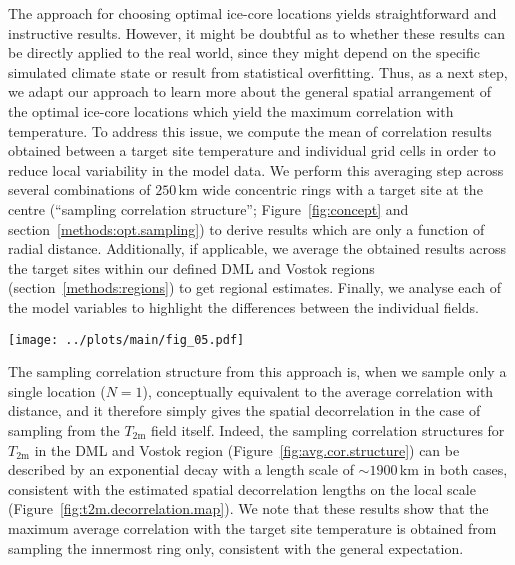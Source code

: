 \documentclass[draft]{agujournal2019}
\begin{document}
The approach for choosing optimal ice-core locations yields straightforward and
instructive results. However, it might be doubtful as to whether these results
can be directly applied to the real world, since they might depend on the
specific simulated climate state or result from statistical overfitting. Thus,
as a next step, we adapt our approach to learn more about the general spatial
arrangement of the optimal ice-core locations which yield the maximum
correlation with temperature. To address this issue, we compute the mean of
correlation results obtained between a target site temperature and individual
grid cells in order to reduce local variability in the model data. We perform
this averaging step across several combinations of $250$\,km wide concentric
rings with a target site at the centre (``sampling correlation structure'';
Figure~\ref{fig:concept} and section~\ref{methods:opt.sampling}) to derive
results which are only a function of radial distance. Additionally, if
applicable, we average the obtained results across the target sites within our
defined DML and Vostok regions (section~\ref{methods:regions}) to get regional
estimates. Finally, we analyse each of the model variables to highlight the
differences between the individual fields.

\begin{figure*}[t]%
\centering
\texttt{[image: ../plots/main/fig\_05.pdf]}
\caption{%
  Sampling correlation structures with temperature for the DML and Vostok
  regions in the case of sampling single locations. Shown is the average
  correlation as a function of distance between the interannual near-surface
  temperature ($T_{2\mathrm{m}}$) at a target site and the spatial fields of
  $T_{2\mathrm{m}}$ (black), oxygen isotope composition
  ($\delta^{18}\mathrm{O}$, green) and precipitation-weighted oxygen isotope
  composition ($\delta^{18}\mathrm{O}^{\mathrm{(pw)}}$, blue). Averaging was
  performed in two steps: first, correlations were averaged across grid cells
  falling within $250$\,km wide consecutive rings around a given target site,
  and secondly, the results were averaged across all respective target sites in
  the DML (\textbf{a}) and Vostok (\textbf{b}) region (see Methods). The black
  dashed lines indicate an exponential fit to the $T_{2\mathrm{m}}$ data.}
\label{fig:avg.cor.structure}%
\end{figure*}%

The sampling correlation structure from this approach is, when we sample only a
single location ($N=1$), conceptually equivalent to the average correlation with
distance, and it therefore simply gives the spatial decorrelation in the case of
sampling from the $T_{\mathrm{2m}}$ field itself. Indeed, the sampling
correlation structures for $T_{\mathrm{2m}}$ in the DML and Vostok region
(Figure~\ref{fig:avg.cor.structure}) can be described by an exponential decay with
a length scale of $\sim1900$\,km in both cases, consistent with the estimated
spatial decorrelation lengths on the local scale
(Figure~\ref{fig:t2m.decorrelation.map}). We note that these results show that
the maximum average correlation with the target site temperature is obtained
from sampling the innermost ring only, consistent with the general expectation.
\end{document}
